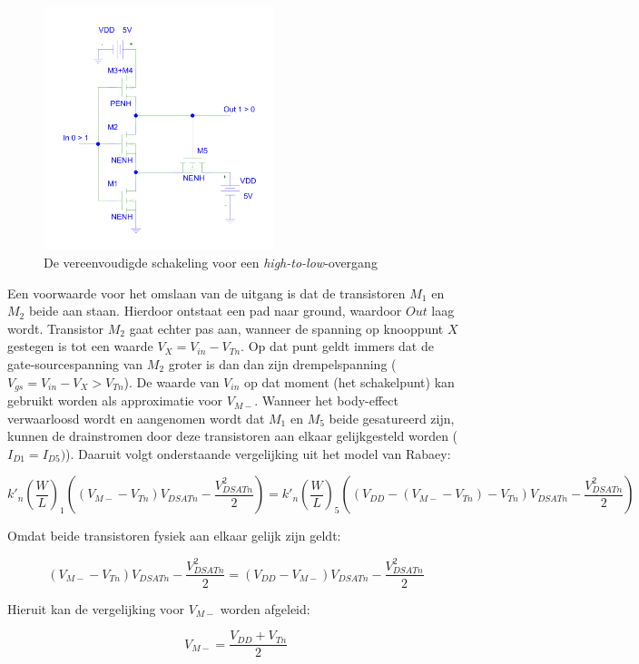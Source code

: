 \documentclass{scrartcl}  %
\begin{document}
\begin{figure}[H]
\centering
	\includegraphics[width=0.6\textwidth]{resource/schmitt-high-to-low-rc.pdf}
	\caption{De vereenvoudigde schakeling voor een \textit{high-to-low}-overgang}
	\label{fig:schmitt-schem-high-to-low}
\end{figure}

Een voorwaarde voor het omslaan van de uitgang is dat de transistoren $M_{1}$ en $M_{2}$ beide aan staan. Hierdoor ontstaat een pad naar ground, waardoor $Out$ laag wordt. Transistor $M_{2}$ gaat echter pas aan, wanneer de spanning op knooppunt $X$ gestegen is tot een waarde $V_{X} = V_{in} - V_{Tn}$. Op dat punt geldt immers dat de gate-sourcespanning van $M_{2}$ groter is dan dan zijn drempelspanning ($V_{gs} = V_{in} - V_{X} > V_{Tn}$). De waarde van $V_{in}$ op dat moment (het schakelpunt) kan gebruikt worden als approximatie voor $V_{M-}$. Wanneer het body-effect verwaarloosd wordt en aangenomen wordt dat $M_{1}$ en $M_{5}$ beide gesatureerd zijn, kunnen de drainstromen door deze transistoren aan elkaar gelijkgesteld worden ($I_{D1} = I_{D5})$). Daaruit volgt onderstaande vergelijking uit het model van Rabaey:

$$k'_{n}(\frac{W}{L})_{1}((V_{M-}-V_{Tn})V_{DSATn} - \frac{V^{2}_{DSATn}}{2}) = k'_{n}(\frac{W}{L})_{5}((V_{DD}-(V_{M-}-V_{Tn})-V_{Tn})V_{DSATn} - \frac{V^{2}_{DSATn}}{2})$$

Omdat beide transistoren fysiek aan elkaar gelijk zijn geldt:

$$(V_{M-}-V_{Tn})V_{DSATn} - \frac{V^{2}_{DSATn}}{2} = (V_{DD}-V_{M-})V_{DSATn} - \frac{V^{2}_{DSATn}}{2}$$

Hieruit kan de vergelijking voor $V_{M-}$ worden afgeleid:

\begin{equation} \label{eq:schmitt-mminus}
V_{M-} = \frac{V_{DD}+V_{Tn}}{2}
\end{equation}
\end{document}
